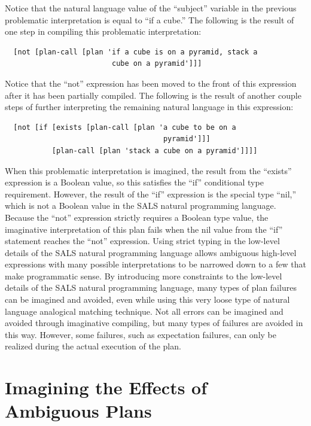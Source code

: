 Notice that the natural language value of the ``subject'' variable in
the previous problematic interpretation is equal to ``if a cube.''
The following is the result of one step in compiling this problematic
interpretation:
\begin{Verbatim}
  [not [plan-call [plan 'if a cube is on a pyramid, stack a
                         cube on a pyramid']]]
\end{Verbatim}
Notice that the ``not'' expression has been moved to the
front of this expression after it has been partially compiled.  The
following is the result of another couple steps of further
interpreting the remaining natural language in this expression:
\begin{Verbatim}
  [not [if [exists [plan-call [plan 'a cube to be on a
                                     pyramid']]]
           [plan-call [plan 'stack a cube on a pyramid']]]]
\end{Verbatim}
When this problematic interpretation is imagined, the result from the
``exists'' expression is a Boolean value, so this satisfies the ``if''
conditional type requirement.  However, the result of the ``if''
expression is the special type ``nil,'' which is not a Boolean value
in the SALS natural programming language.  Because the ``not''
expression strictly requires a Boolean type value, the imaginative
interpretation of this plan fails when the nil value from the ``if''
statement reaches the ``not'' expression.  Using strict typing in the
low-level details of the SALS natural programming language allows
ambiguous high-level expressions with many possible interpretations to
be narrowed down to a few that make programmatic sense.  By
introducing more constraints to the low-level details of the SALS
natural programming language, many types of plan failures can be
imagined and avoided, even while using this very loose type of natural
language analogical matching technique.  Not all errors can be
imagined and avoided through imaginative compiling, but many types of
failures are avoided in this way.  However, some failures, such as
expectation failures, can only be realized during the actual execution
of the plan.

\section{Imagining the Effects of Ambiguous Plans}
\label{section:imagining_the_effects_of_ambiguous_plans}

